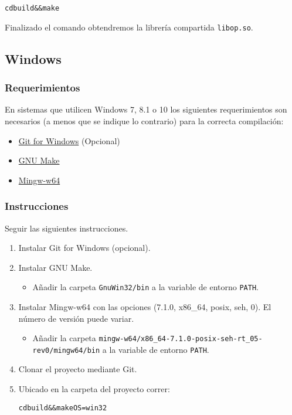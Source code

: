 \documentclass[12pt,a4paper,final]{article}
\begin{document}
			\begin{alltt}
				cd build && make
			\end{alltt}

			Finalizado el comando obtendremos la librería compartida \texttt{libop.so}.

	\subsection{Windows}
		\subsubsection{Requerimientos}
			En sistemas que utilicen Windows 7, 8.1 o 10 los siguientes requerimientos
			son necesarios (a menos que se indique lo contrario) para la correcta compilación:
			\begin{itemize}
				\item \href{https://git-scm.com/download/win}{Git for Windows} (Opcional)
				\item \href{http://gnuwin32.sourceforge.net/packages/make.htm}{GNU Make}
				\item \href{https://sourceforge.net/projects/mingw-w64/}{Mingw-w64}
			\end{itemize}
		\subsubsection{Instrucciones}
			Seguir las siguientes instrucciones.

			\begin{enumerate}
				\item Instalar Git for Windows (opcional).
				\item Instalar GNU Make.
					\begin{itemize}
						\item Añadir la carpeta \texttt{GnuWin32/bin} a la variable de entorno \texttt{PATH}.
					\end{itemize}
				\item Instalar Mingw-w64 con las opciones (7.1.0, x86\_64, posix, seh, 0). El número de versión puede variar.
					\begin{itemize}
						\item Añadir la carpeta \texttt{mingw-w64/x86\_64-7.1.0-posix-seh-rt\_05-rev0/mingw64/bin} a la variable de entorno \texttt{PATH}.
					\end{itemize}
				\item Clonar el proyecto mediante Git.
				\item Ubicado en la carpeta del proyecto correr:
						\begin{alltt}
							cd build \&\& make OS=win32
						\end{alltt}
			\end{enumerate}
\end{document}
